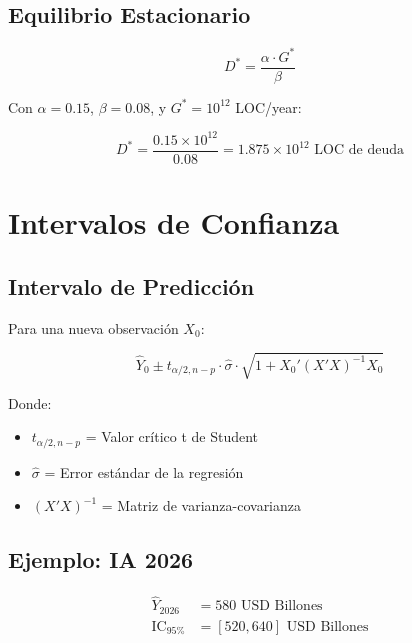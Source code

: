 \documentclass{article}
\begin{document}
\subsection{Equilibrio Estacionario}

\begin{equation}
D^* = \frac{\alpha \cdot G^*}{\beta}
\end{equation}

Con $\alpha = 0.15$, $\beta = 0.08$, y $G^* = 10^{12}$ LOC/year:

\begin{equation}
D^* = \frac{0.15 \times 10^{12}}{0.08} = 1.875 \times 10^{12} \text{ LOC de deuda}
\end{equation}

\section{Intervalos de Confianza}

\subsection{Intervalo de Predicción}

Para una nueva observación $X_0$:

\begin{equation}
\hat{Y}_0 \pm t_{\alpha/2, n-p} \cdot \hat{\sigma} \cdot \sqrt{1 + X_0'(X'X)^{-1}X_0}
\end{equation}

Donde:
\begin{itemize}
    \item $t_{\alpha/2, n-p}$ = Valor crítico t de Student
    \item $\hat{\sigma}$ = Error estándar de la regresión
    \item $(X'X)^{-1}$ = Matriz de varianza-covarianza
\end{itemize}

\subsection{Ejemplo: IA 2026}

\begin{align}
\hat{Y}_{2026} &= 580 \text{ USD Billones} \\
\text{IC}_{95\%} &= [520, 640] \text{ USD Billones}
\end{align}
\end{document}
